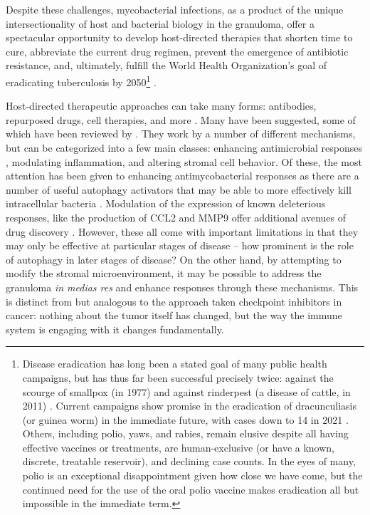 Despite these challenges, mycobacterial infections, as a product of the unique intersectionality of host and bacterial biology in the granuloma, offer a spectacular opportunity to develop host\hyp{}directed therapies that shorten time to cure, abbreviate the current drug regimen, prevent the emergence of antibiotic resistance, and, ultimately, fulfill the World Health Organization's goal of eradicating tuberculosis by 2050\footnote{Disease eradication has long been a stated goal of many public health campaigns, but has thus far been successful precisely twice: against the scourge of smallpox (in 1977) and against rinderpest (a disease of cattle, in 2011) \citep{Hopkins2013, Mariner2012}. Current campaigns show promise in the eradication of dracunculiasis (or guinea worm) in the immediate future, with cases down to 14 in 2021 \citep{Kreier2022}. Others, including polio, yaws, and rabies, remain elusive despite all having effective vaccines or treatments, are human\hyp{}exclusive (or have a known, discrete, treatable reservoir), and declining case counts. In the eyes of many, polio is an exceptional disappointment given how close we have come, but the continued need for the use of the oral polio vaccine makes eradication all but impossible in the immediate term.} \citep{Schwegmann2008}. 

Host\hyp{}directed therapeutic approaches can take many forms: antibodies, repurposed drugs, cell therapies, and more \citep{Zumla2016}. Many have been suggested, some of which have been reviewed by \citet{Wallis2015}. They work by a number of different mechanisms, but can be categorized into a few main classes: enhancing antimicrobial responses \citep{Khan2016}, modulating inflammation, and altering stromal cell behavior. Of these, the most attention has been given to enhancing antimycobacterial responses as there are a number of useful autophagy activators that may be able to more effectively kill intracellular bacteria \citep{Wallis2015}. Modulation of the expression of known deleterious responses, like the production of CCL2 and MMP9 offer additional avenues of drug discovery \citep{Volkman2010, Cambier2014b}. However, these all come with important limitations in that they may only be effective at particular stages of disease -- how prominent is the role of autophagy in later stages of disease? On the other hand, by attempting to modify the stromal microenvironment, it may be possible to address the granuloma \textit{in medias res} and enhance responses through these mechanisms. This is distinct from but analogous to the approach taken checkpoint inhibitors in cancer: nothing about the tumor itself has changed, but the way the immune system is engaging with it changes fundamentally. 


